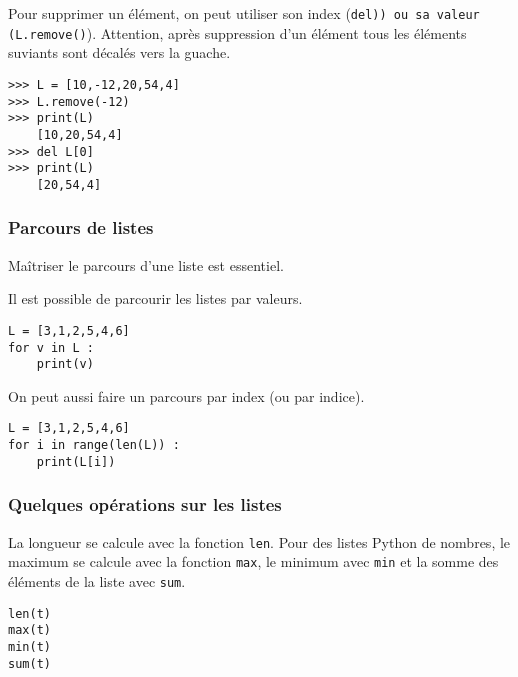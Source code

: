Pour supprimer un élément, on peut utiliser son index (\lstinline(del)) ou sa valeur (\lstinline{(L.remove()}). Attention, après suppression d'un élément tous les éléments suviants sont décalés vers la guache.  
\begin{lstlisting}
>>> L = [10,-12,20,54,4]
>>> L.remove(-12)
>>> print(L)
    [10,20,54,4]
>>> del L[0]
>>> print(L)
    [20,54,4]
\end{lstlisting}


\subsubsection{Parcours de listes}

\newcommand{\heart}{\ensuremath\heartsuit}


   

Maîtriser le parcours d'une liste est essentiel.


\begin{minipage}[c]{.47\linewidth}
Il est possible de parcourir les listes par valeurs. 
\begin{lstlisting}
L = [3,1,2,5,4,6]
for v in L : 
    print(v)
\end{lstlisting}
\end{minipage}
\hfill
\begin{minipage}[c]{.47\linewidth}
On peut aussi faire un parcours par index (ou par indice).
\begin{lstlisting}
L = [3,1,2,5,4,6]
for i in range(len(L)) : 
    print(L[i])
\end{lstlisting}
\end{minipage}



\subsubsection{Quelques opérations sur les listes}
La longueur se calcule avec la fonction \texttt{len}. Pour des listes Python de nombres, le maximum 
se calcule avec la fonction \texttt{max}, le minimum avec \texttt{min} et la somme des éléments de la 
liste avec \texttt{sum}.
\begin{lstlisting}
len(t)
max(t)
min(t)
sum(t)
\end{lstlisting}

